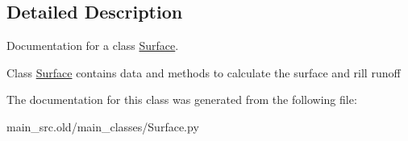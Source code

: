\subsection{Detailed Description}
Documentation for a class \hyperlink{classmain__src_8old_1_1main__classes_1_1Surface_1_1Surface}{Surface}. 

Class \hyperlink{classmain__src_8old_1_1main__classes_1_1Surface_1_1Surface}{Surface} contains data and methods to calculate the surface and rill runoff 

The documentation for this class was generated from the following file\-:\begin{DoxyCompactItemize}
\item 
main\-\_\-src.\-old/main\-\_\-classes/Surface.\-py\end{DoxyCompactItemize}
